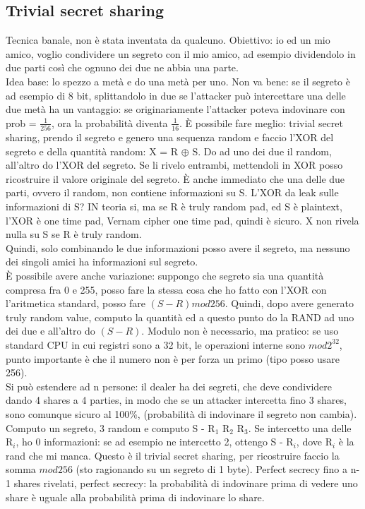 \documentclass[16px]{article}
\begin{document}
\subsection{Trivial secret sharing}
Tecnica banale, non è stata inventata da qualcuno. Obiettivo: io ed un mio amico, voglio condividere un segreto con il mio amico, ad esempio dividendolo in due parti così che ognuno dei due ne abbia una parte.\\ Idea base: lo spezzo a metà e do una metà per uno. Non va bene: se il segreto è ad esempio di 8 bit, splittandolo in due se l'attacker può intercettare una delle due metà ha un vantaggio: se originariamente l'attacker poteva indovinare con prob = $\frac{1}{256}$, ora la probabilità diventa $\frac{1}{16}$. È possibile fare meglio: trivial secret sharing, prendo il segreto e genero una sequenza random e faccio l'XOR del segreto e della quantità random: X = R $\oplus$ S. Do ad uno dei due il random, all'altro do l'XOR del segreto. Se li rivelo entrambi, mettendoli in XOR posso ricostruire il valore originale del segreto. È anche immediato che una delle due parti, ovvero il random, non contiene informazioni su S. L'XOR da leak sulle informazioni di S? IN teoria si, ma se R è truly random pad, ed S è plaintext, l'XOR è one time pad, Vernam cipher one time pad, quindi è sicuro. X non rivela nulla su S se R è truly random.\\ Quindi, solo combinando le due informazioni posso avere il segreto, ma nessuno dei singoli amici ha informazioni sul segreto.\\ È possibile avere anche variazione: suppongo che segreto sia una quantità compresa fra 0 e 255, posso fare la stessa cosa che ho fatto con l'XOR con l'aritmetica standard, posso fare $(S - R)mod256$. Quindi, dopo avere generato truly random value, computo la quantità ed a questo punto do la RAND ad uno dei due e all'altro do $(S - R)$. Modulo non è necessario, ma pratico: se uso standard CPU in cui registri sono a 32 bit, le operazioni interne sono $mod2^{32}$, punto importante è che il numero non è per forza un primo (tipo posso usare 256).\\ Si può estendere ad n persone: il dealer ha dei segreti, che deve condividere dando 4 shares a 4 parties, in modo che se un attacker intercetta fino 3 shares, sono comunque sicuro al 100\%, (probabilità di indovinare il segreto non cambia). Computo un segreto, 3 random e computo S - R$_{1}$ R$_{2}$ R$_{3}$. Se intercetto una delle R$_{i}$, ho 0 informazioni: se ad esempio ne intercetto 2, ottengo S - R$_{i}$, dove R$_{i}$ è la rand che mi manca. Questo è il trivial secret sharing, per ricostruire faccio la somma $mod256$ (sto ragionando su un segreto di 1 byte). Perfect secrecy fino a n-1 shares rivelati, perfect secrecy: la probabilità di indovinare prima di vedere uno share è uguale alla probabilità prima di indovinare lo share.
\end{document}
